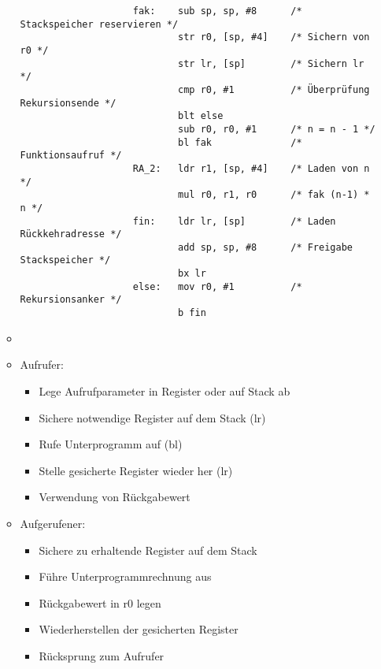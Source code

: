 \begin{itemize}
\begin{itemize}
\begin{verbatim}
                    fak:    sub sp, sp, #8      /* Stackspeicher reservieren */
                            str r0, [sp, #4]    /* Sichern von r0 */
                            str lr, [sp]        /* Sichern lr */
                            cmp r0, #1          /* Überprüfung Rekursionsende */
                            blt else            
                            sub r0, r0, #1      /* n = n - 1 */
                            bl fak              /* Funktionsaufruf */
                    RA_2:   ldr r1, [sp, #4]    /* Laden von n */
                            mul r0, r1, r0      /* fak (n-1) * n */
                    fin:    ldr lr, [sp]        /* Laden Rückkehradresse */
                            add sp, sp, #8      /* Freigabe Stackspeicher */
                            bx lr
                    else:   mov r0, #1          /* Rekursionsanker */
                            b fin
                    \end{verbatim}
                \item[]
                \item Aufrufer:
                    \begin{itemize}
                        \item Lege Aufrufparameter in Register oder auf Stack ab 
                        \item Sichere notwendige Register auf dem Stack (lr)
                        \item Rufe Unterprogramm auf (bl)
                        \item Stelle gesicherte Register wieder her (lr)
                        \item Verwendung von Rückgabewert
                    \end{itemize}
                
                \item Aufgerufener:
                    \begin{itemize}
                        \item Sichere zu erhaltende Register auf dem Stack 
                        \item Führe Unterprogrammrechnung aus
                        \item Rückgabewert in r0 legen
                        \item Wiederherstellen der gesicherten Register
                        \item Rücksprung zum Aufrufer
                    \end{itemize}
            \end{itemize}
    \end{itemize}

